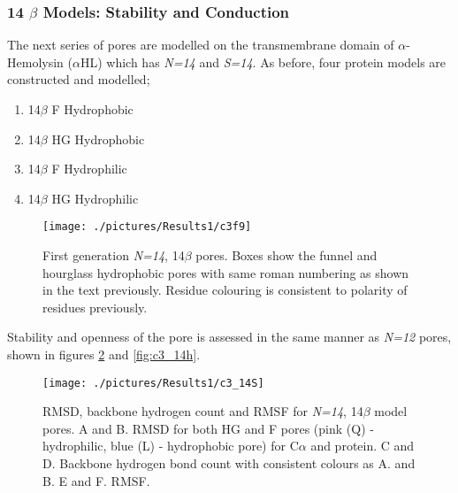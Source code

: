 \subsubsection{14 $\beta$ Models: Stability and Conduction}

The next series of pores are modelled on the transmembrane domain of $\alpha$-Hemolysin ($\alpha$HL) which has \textit{N=14} and \textit{S=14}. As before, four protein models are constructed and modelled;

\begin{enumerate}[i]
\setlength\itemsep{0.1em}
  \item 14$\beta$ F Hydrophobic
  \item 14$\beta$ HG Hydrophobic
  \item 14$\beta$ F Hydrophilic 
  \item 14$\beta$ HG Hydrophilic
\end{enumerate}

\begin{figure}[H]
\begin{center}
\texttt{[image: ./pictures/Results1/c3f9]}
\caption[First generation \textit{N=14}, 14$\beta$ pores.] {First generation \textit{N=14}, 14$\beta$ pores. Boxes show the funnel and hourglass hydrophobic pores with same roman numbering as shown in the text previously. Residue colouring is consistent to polarity of residues previously.}
\label{fig:c3f9}
\end{center}
\end{figure}

Stability and openness of the pore is assessed in the same manner as \textit{N=12} pores, shown in figures \ref{fig:c3_14S} and \ref{fig:c3_14h}. 


\begin{figure}[H]
\begin{center}
\texttt{[image: ./pictures/Results1/c3\_14S]}
\caption[RMSD, backbone hydrogen count and RMSF for \textit{N=14}, 14$\beta$ model pores.] {RMSD, backbone hydrogen count and RMSF for \textit{N=14}, 14$\beta$ model pores. A and B. RMSD for both HG and F pores (pink (Q) - hydrophilic, blue (L) - hydrophobic pore) for C$\alpha$ and protein. C and D. Backbone hydrogen bond count with consistent colours as A. and B.  E and F. RMSF.}
\label{fig:c3_14S}
\end{center}
\end{figure}


